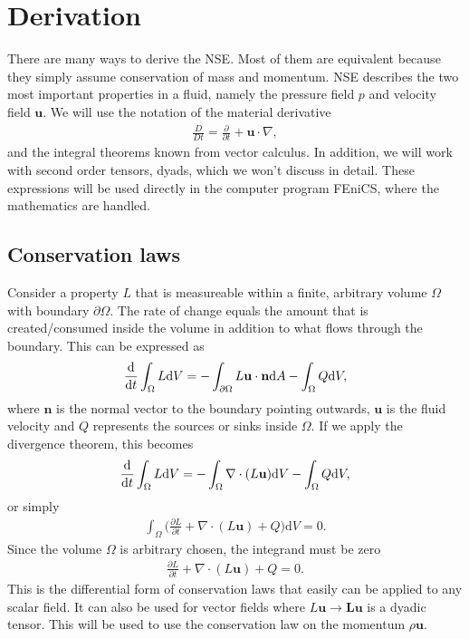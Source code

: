 \documentclass[a4paper,10pt]{article}
\renewcommand{\vec}[1]{\mathbf{#1}}
\renewcommand{\(}{\left(}
\renewcommand{\)}{\right)}
\newcommand{\dm}[1]{\text{d}#1}
\newcommand{\dpart}[2]{\frac{\partial#1}{\partial#2}}
\begin{document}
\section{Derivation}
There are many ways to derive the NSE. Most of them are equivalent because they simply assume conservation of mass and momentum. NSE describes the two most important properties in a fluid, namely the pressure field $p$ and velocity field $\vec u$. We will use the notation of the material derivative 
\begin{align*}
  \frac{D}{Dt} = \dpart{}{t} + \vec u \cdot \nabla,
\end{align*}
and the integral theorems known from vector calculus. In addition, we will work with second order tensors, dyads, which we won't discuss in detail. These expressions will be used directly in the computer program FEniCS\cite{fenics}, where the mathematics are handled.

\subsection{Conservation laws}
Consider a property $L$ that is measureable within a finite, arbitrary volume $\Omega$ with boundary $\partial \Omega$. The rate of change equals the amount that is created/consumed inside the volume in addition to what flows through the boundary. This can be expressed as
\begin{align*}
  \frac{\dm }{\dm t} \int_\Omega L \dm V = -\int_{\partial \Omega} L\vec u \cdot \vec n \dm A - \int_\Omega Q \dm V,
\end{align*}
where $\vec n$ is the normal vector to the boundary pointing outwards, $\vec u$ is the fluid velocity and $Q$ represents the sources or sinks inside $\Omega$. If we apply the divergence theorem, this becomes
\begin{align*}
  \frac{\dm }{\dm t} \int_\Omega L \dm V = -\int_{\Omega} \nabla \cdot (L\vec u) \dm V - \int_\Omega Q \dm V,
\end{align*}
or simply
\begin{align*}
\int_\Omega \Bigg(\dpart{L}{t} + \nabla \cdot (L\vec u) + Q \Bigg)\dm V = 0.
\end{align*}
Since the volume $\Omega$ is arbitrary chosen, the integrand must be zero
\begin{align}
  \label{eq:conservation_law}
  \dpart{L}{t} + \nabla \cdot (L\vec u) + Q = 0.
\end{align}
This is the differential form of conservation laws that easily can be applied to any scalar field. It can also be used for vector fields where $L\vec u\rightarrow\vec L\vec u$ is a dyadic tensor. This will be used to use the conservation law on the momentum $\rho \vec u$.
\end{document}
